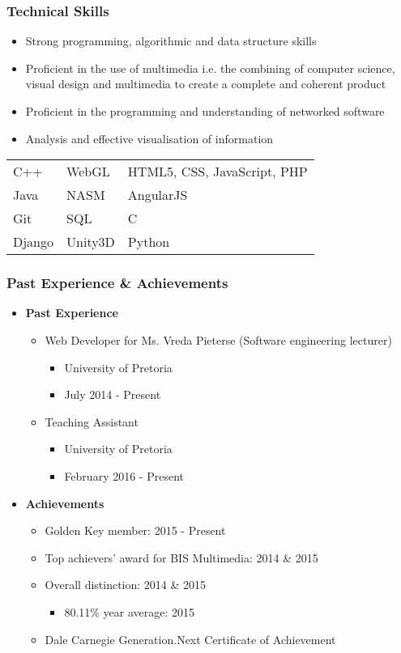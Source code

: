	\subsubsection{Technical Skills}
		\begin{itemize}
			\item Strong programming, algorithmic and data structure skills
			\item Proficient in the use of multimedia i.e. the combining of computer science, visual design and multimedia to create a complete and coherent product
			\item Proficient in the programming and understanding of networked software
			\item Analysis and effective visualisation of information
		\end{itemize}
		\begin{tabular}{| l | l | l |}
			C++		& WebGL		& HTML5, CSS, JavaScript, PHP   	\\
			Java    & NASM     	& AngularJS							\\
			Git 	& SQL     	& C									\\
			Django 	& Unity3D 	& Python                     
		\end{tabular}
		
	\subsubsection{Past Experience \& Achievements}
		\begin{itemize}
			\item \textbf{Past Experience}
			\begin{itemize}
				\item Web Developer for Ms. Vreda Pieterse (Software engineering lecturer)
				\begin{itemize}
					\item University of Pretoria
					\item July 2014 - Present
				\end{itemize}
				\item Teaching Assistant
				\begin{itemize}
					\item University of Pretoria
					\item February 2016 - Present
				\end{itemize}
			\end{itemize}
			
			\item \textbf{Achievements}
			\begin{itemize}
				\item Golden Key member: 2015 - Present
				\item Top achievers' award for BIS Multimedia: 2014 \& 2015
				\item Overall distinction: 2014 \& 2015
				\begin{itemize}
					\item 80.11\% year average: 2015
				\end{itemize}
				\item Dale Carnegie Generation.Next Certificate of Achievement
			\end{itemize}
		\end{itemize}
		
